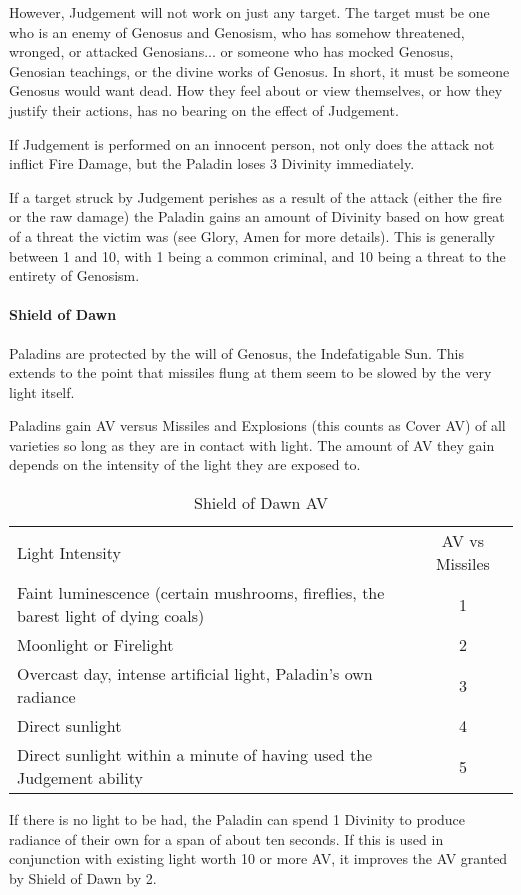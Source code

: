 \documentclass[oneside,11pt,english]{book}
\begin{document}
However, Judgement will not work on just any target. The target must be one who is an enemy of 
Genosus and Genosism, who has somehow threatened, wronged, or attacked Genosians... or 
someone who has mocked Genosus, Genosian teachings, or the divine works of Genosus. In 
short, it must be someone Genosus would want dead. How they feel about or view themselves, or 
how they justify their actions, has no bearing on the effect of Judgement. 


If Judgement is performed on an innocent person, not only does the attack not inflict Fire 
Damage, but the Paladin loses 3 Divinity immediately. 


If a target struck by Judgement perishes as a result of the attack (either the fire or the raw 
damage) the Paladin gains an amount of Divinity based on how great of a threat the victim was 
(see Glory, Amen for more details). This is generally between 1 and 10, with 1 being a common 
criminal, and 10 being a threat to the entirety of Genosism. 
\paragraph{Shield of Dawn}
Paladins are protected by the will of Genosus, the Indefatigable Sun. This extends to the point 
that missiles flung at them seem to be slowed by the very light itself.


Paladins gain AV versus Missiles and Explosions (this counts as Cover AV) of all varieties so 
long as they are in contact with light. The amount of AV they gain depends on the intensity of the 
light they are exposed to.\par
\begin{table}[!ht]
	\caption{Shield of Dawn AV}
	\label{tab:Shield of Dawn AV}
	\begin{tabu} spread 0pt {Xc}
		Light Intensity& AV vs Missiles\\
		Faint luminescence (certain mushrooms, fireflies, the barest light of dying coals)& 1\\
		Moonlight or Firelight &2\\
		Overcast day, intense artificial light, Paladin's own radiance& 3\\
		Direct sunlight& 4\\
		Direct sunlight within a minute of having used the Judgement ability& 5\\
	\end{tabu}
\end{table}
If there is no light to be had, the Paladin can spend 1 Divinity to produce radiance of their own 
for a span of about ten seconds. If this is used in conjunction with existing light worth 10 or more 
AV, it improves the AV granted by Shield of Dawn by 2. 
\end{document}

